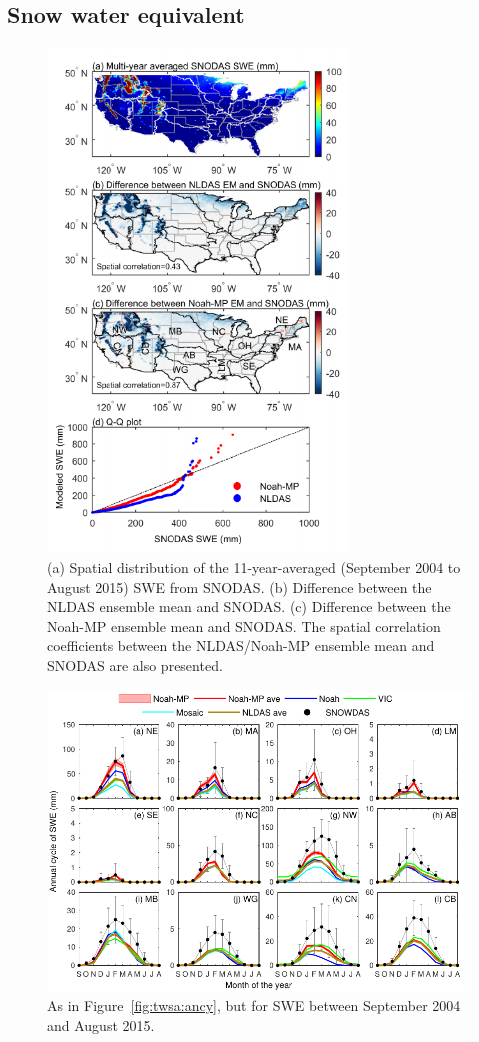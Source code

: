 \documentclass[essd, manuscript]{copernicus}
\begin{document}
\subsection{Snow water equivalent}\label{sec:results:swe}

\begin{figure}[t]
  \includegraphics[width=8cm]{fig/fig07.pdf}
  \caption{(a) Spatial distribution of the 11-year-averaged (September 2004 to August 2015) SWE from SNODAS\@. (b) Difference between the NLDAS ensemble mean and SNODAS\@. (c) Difference between the Noah-MP ensemble mean and SNODAS\@. The spatial correlation coefficients between the NLDAS/Noah-MP ensemble mean and SNODAS are also presented.}
  \label{fig:swe:clim}
\end{figure}

\begin{figure}[t]
  \includegraphics[width=14cm]{fig/fig08.pdf}
  \caption{As in Figure~\ref{fig:twsa:ancy}, but for SWE between September 2004 and August 2015.}
  \label{fig:swe:ancy}
\end{figure}
\end{document}

